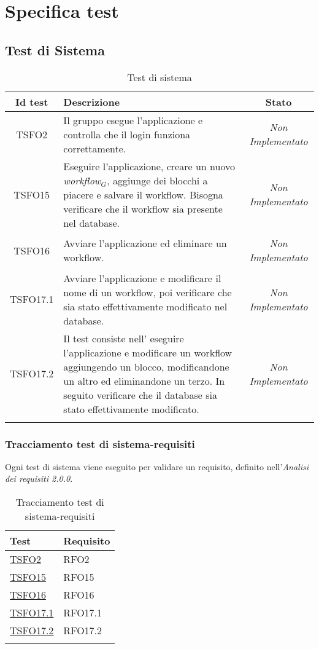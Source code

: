 \chapter{Specifica test}
\label{test}
\section{Test di Sistema}
\normalsize
\begin{longtable}{|c|>{}m{8cm}|c|}
\hline 
\textbf{Id test} & \textbf{Descrizione} & \textbf{Stato}\\
\hline
\endhead
\hypertarget{TSFO2}{TSFO2} & Il gruppo esegue l'applicazione e controlla che il login funziona correttamente. & \textit{Non Implementato}\\ \hline
\hypertarget{TSFO15}{TSFO15} & Eseguire l'applicazione, creare un nuovo \textit{workflow$_{G}$}, aggiunge dei blocchi a piacere e salvare il workflow. Bisogna verificare che il workflow sia presente nel database. & \textit{Non Implementato}\\ \hline
\hypertarget{TSFO16}{TSFO16} & Avviare l'applicazione ed eliminare un workflow. & \textit{Non Implementato}\\ \hline
\hypertarget{TSFO17.1}{TSFO17.1} & Avviare l'applicazione e modificare il nome di un workflow, poi verificare che sia stato effettivamente modificato nel database. & \textit{Non Implementato}\\ \hline
\hypertarget{TSFO17.2}{TSFO17.2} & Il test consiste nell' eseguire l'applicazione e modificare un workflow aggiungendo un blocco, modificandone un altro ed eliminandone un terzo. In seguito verificare che il database sia stato effettivamente modificato. & \textit{Non Implementato}\\ \hline
\caption[Test di Sistema]{Test di sistema}
\label{tabella:test1}
\end{longtable}
\clearpage
\subsection{Tracciamento test di sistema-requisiti}
Ogni test di sistema viene eseguito per validare un requisito, definito nell'\textit{Analisi dei requisiti 2.0.0}.
\normalsize
\begin{longtable}{|>{\centering}m{5cm}|m{5cm}<{\centering}|}
\hline
\textbf{Test} & \textbf{Requisito}\\
\hline
\endhead
\hyperlink{TSFO2}{TSFO2} & RFO2\\ \hline
\hyperlink{TSFO15}{TSFO15} & RFO15\\ \hline
\hyperlink{TSFO16}{TSFO16} & RFO16\\ \hline
\hyperlink{TSFO17.1}{TSFO17.1} & RFO17.1\\ \hline
\hyperlink{TSFO17.2}{TSFO17.2} & RFO17.2\\ \hline
\caption[Tracciamento test di sistema-requisiti]{Tracciamento test di sistema-requisiti}
\label{tabella:ts-requi}
\end{longtable}

